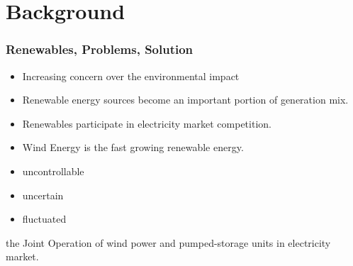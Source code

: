 \section{Background}
\begin{frame}
\frametitle{Renewables, Problems, Solution}
\begin{itemize}
\item Increasing concern over the environmental impact
\item Renewable energy sources become an important portion of generation mix.
\item Renewables participate in electricity market competition.
\item Wind Energy is the fast growing renewable energy.
\end{itemize}
\begin{tcolorbox}[colback=red!5,colframe=red!40!black,title= Drawbacks of Wind]
  \begin{itemize}
  \item uncontrollable
  \item uncertain
  \item fluctuated
  \end{itemize}
\end{tcolorbox}
\begin{tcolorbox}[colback=green!5,colframe=green!40!black,title= Solution]
the Joint Operation of wind power and pumped-storage units in electricity market.
\end{tcolorbox}
\end{frame}
